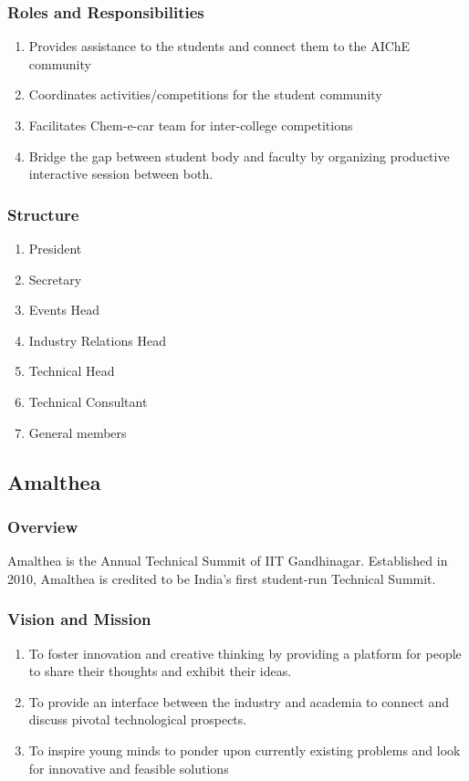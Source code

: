 \documentclass[12pt]{article}
\begin{document}
\subsubsection*{Roles and Responsibilities}
\begin{enumerate}
    \item Provides assistance to the students and connect them to the AIChE community
    \item Coordinates activities/competitions for the student community
    \item Facilitates Chem-e-car team for inter-college competitions
    \item Bridge the gap between student body and faculty by organizing productive interactive session between both.
\end{enumerate}

\subsubsection{Structure}
\begin{enumerate}
    \item President
    \item Secretary
    \item Events Head
    \item Industry Relations Head
    \item Technical Head
    \item Technical Consultant
    \item General members
\end{enumerate}


\subsection{Amalthea}
\subsubsection{Overview}
Amalthea is the Annual Technical Summit of IIT Gandhinagar. Established in 2010, Amalthea is credited to be India’s first student-run Technical Summit.

\subsubsection{Vision and Mission}
\begin{enumerate}
    \item To foster innovation and creative thinking by providing a platform for people to share their thoughts and exhibit their ideas.
    \item To provide an interface between the industry and academia to connect and discuss pivotal technological prospects.
    \item To inspire young minds to ponder upon currently existing problems and look for innovative and feasible solutions
\end{enumerate}
\end{document}

